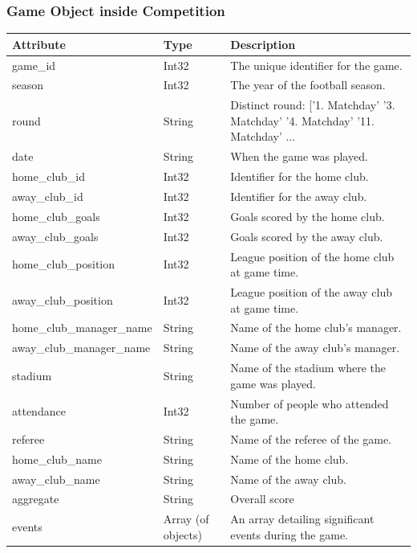 \documentclass{Configuration_Files/PoliMi3i_thesis}
\begin{document}
\subsubsection{Game Object inside Competition}
    \begin{tabular}{|l|l|p{8cm}|}
        \hline
        \textbf{Attribute}            & \textbf{Type}           & \textbf{Description} \\ \hline
    game\_id                      & Int32                   & The unique identifier for the game. \\ \hline
    season                        & Int32                   & The year of the football season. \\ \hline
    round                         & String                  & Distinct round: ['1. Matchday' '3. Matchday' '4. Matchday' '11. Matchday'  $\ldots$    \\ \hline
    date                          & String                  & When the game was played. \\ \hline
    home\_club\_id                & Int32                   & Identifier for the home club. \\ \hline
    away\_club\_id                & Int32                   & Identifier for the away club. \\ \hline
    home\_club\_goals             & Int32                   & Goals scored by the home club. \\ \hline
    away\_club\_goals             & Int32                   & Goals scored by the away club. \\ \hline
    home\_club\_position          & Int32                   & League position of the home club at game time. \\ \hline
    away\_club\_position          & Int32                   & League position of the away club at game time. \\ \hline
    home\_club\_manager\_name     & String                  & Name of the home club's manager. \\ \hline
    away\_club\_manager\_name     & String                  & Name of the away club's manager. \\ \hline
    stadium                       & String                  & Name of the stadium where the game was played. \\ \hline
    attendance                    & Int32                   & Number of people who attended the game. \\ \hline
    referee                       & String                  & Name of the referee of the game. \\ \hline
    home\_club\_name              & String                  & Name of the home club. \\ \hline
    away\_club\_name              & String                  & Name of the away club. \\ \hline
    aggregate                     & String                  & Overall score \\ \hline
    events                        & Array (of objects)      & An array detailing significant events during the game. \\ \hline
    \end{tabular}
\end{document}
